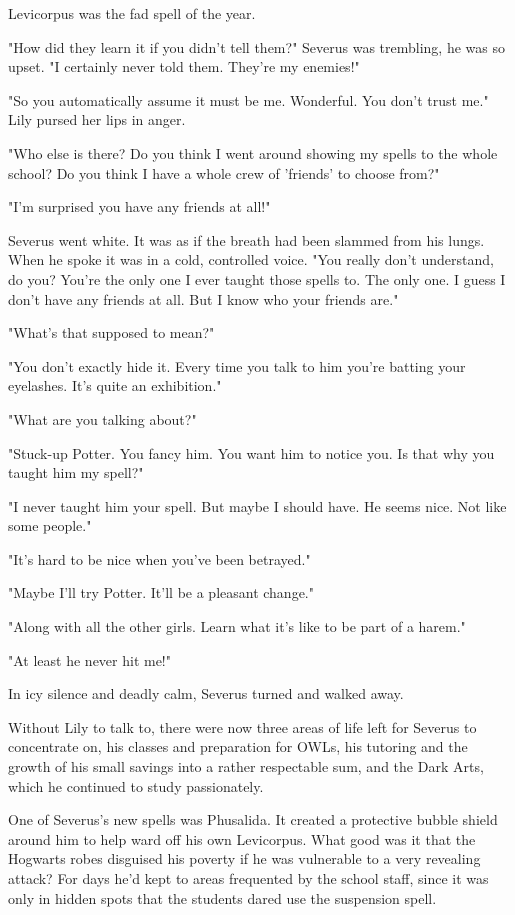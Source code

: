 \documentclass[a4paper,11pt]{article}
\begin{document}
Levicorpus was the fad spell of the year.

"How did they learn it if you didn't tell them?" Severus was trembling, he was so upset. "I certainly never told them. They're my enemies!"

"So you automatically assume it must be me. Wonderful. You don't trust me." Lily pursed her lips in anger.

"Who else is there? Do you think I went around showing my spells to the whole school? Do you think I have a whole crew of 'friends' to choose from?"

"I'm surprised you have any friends at all!"

Severus went white. It was as if the breath had been slammed from his lungs. When he spoke it was in a cold, controlled voice. "You really don't understand, do you? You're the only one I ever taught those spells to. The only one. I guess I don't have any friends at all. But I know who your friends are."

"What's that supposed to mean?"

"You don't exactly hide it. Every time you talk to him you're batting your eyelashes. It's quite an exhibition."

"What are you talking about?"

"Stuck-up Potter. You fancy him. You want him to notice you. Is that why you taught him my spell?"

"I never taught him your spell. But maybe I should have. He seems nice. Not like some people."

"It's hard to be nice when you've been betrayed."

"Maybe I'll try Potter. It'll be a pleasant change."

"Along with all the other girls. Learn what it's like to be part of a harem."

"At least he never hit me!"

In icy silence and deadly calm, Severus turned and walked away.

Without Lily to talk to, there were now three areas of life left for Severus to concentrate on, his classes and preparation for OWLs, his tutoring and the growth of his small savings into a rather respectable sum, and the Dark Arts, which he continued to study passionately.

One of Severus's new spells was Phusalida. It created a protective bubble shield around him to help ward off his own Levicorpus. What good was it that the Hogwarts robes disguised his poverty if he was vulnerable to a very revealing attack? For days he'd kept to areas frequented by the school staff, since it was only in hidden spots that the students dared use the suspension spell.
\end{document}
